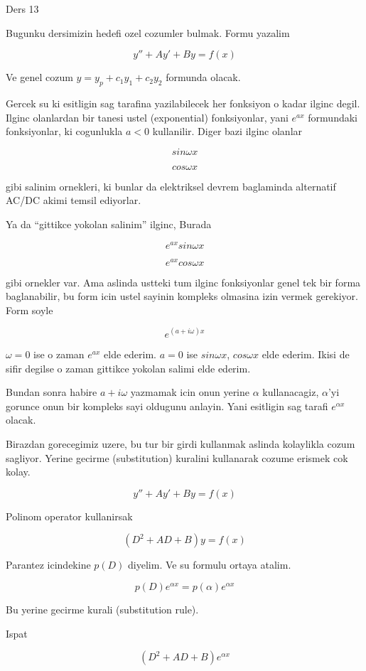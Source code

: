 \documentclass[12pt,fleqn]{article}
\begin{document}
Ders 13

Bugunku dersimizin hedefi ozel cozumler bulmak. Formu yazalim

\[ y'' + Ay' + By = f(x) \]

Ve genel cozum $y = y_p + c_1y_1 + c_2y_2$ formunda olacak. 

Gercek su ki esitligin sag tarafina yazilabilecek her fonksiyon o kadar
ilginc degil. Ilginc olanlardan bir tanesi ustel (exponential)
fonksiyonlar, yani $e^{ax}$ formundaki fonksiyonlar, ki cogunlukla $a<0$
kullanilir. Diger bazi ilginc olanlar 

\[ sin \omega x \]

\[ cos \omega x \]

gibi salinim
ornekleri, ki bunlar da elektriksel devrem baglaminda alternatif AC/DC
akimi temsil ediyorlar.

Ya da ``gittikce yokolan salinim'' ilginc, Burada 

\[ e^{ax}sin \omega x \]

\[ e^{ax}cos \omega x \]

gibi ornekler var. Ama aslinda ustteki tum ilginc fonksiyonlar genel tek
bir forma baglanabilir, bu form icin ustel sayinin kompleks olmasina izin
vermek gerekiyor. Form soyle

\[ e^{(a+i\omega)x} \]

$\omega = 0$ ise o zaman $e^{ax}$ elde ederim. $a=0$ ise $sin\omega x$,
$cos\omega x$ elde ederim. Ikisi de sifir degilse o zaman gittikce yokolan
salimi elde ederim. 

Bundan sonra habire $a+i\omega$ yazmamak icin onun yerine $\alpha$
kullanacagiz, $\alpha$'yi gorunce onun bir kompleks sayi oldugunu
anlayin. Yani esitligin sag tarafi $e^{\alpha x}$ olacak. 

Birazdan gorecegimiz uzere, bu tur bir girdi kullanmak aslinda kolaylikla
cozum sagliyor. Yerine gecirme (substitution) kuralini kullanarak cozume
erismek cok kolay. 

\[ y'' + Ay' + By = f(x) \]

Polinom operator kullanirsak

\[ (D^2 + AD + B )y = f(x) \]

Parantez icindekine $p(D)$ diyelim. Ve su formulu ortaya atalim. 

\[ p(D)e^{\alpha x} = p(\alpha)e^{\alpha x}  \]

Bu yerine gecirme kurali (substitution rule). 

Ispat

\[ (D^2 + AD + B )e^{\alpha x} \]
\end{document}

